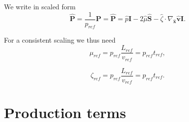 \documentclass[a4paper,11pt,english]{article}
\begin{document}
We write in scaled form
\begin{equation}
     \hat{\mathbf{P}} = \frac{1}{p_{ref}}{\mathbf{P}} = \hat{\mathbf{P}} = \hat{p} \mathbf{I} - 2\hat{\mu} \hat{\mathbf{S}} - \hat{\zeta} \cdot \nabla_{\hat{\mathbf{x}}} \hat{\mathbf{v}} \mathbf{I}.
\end{equation}

For a consistent scaling we thus need
\begin{equation}
     \mu_{ref} = p_{ref} \frac{L_{ref}}{v_{ref}} = p_{ref} t_{ref},
\end{equation}

\begin{equation}
     \zeta_{ref} = p_{ref} \frac{L_{ref}}{v_{ref}} = p_{ref} t_{ref}.
\end{equation}

\section{Production terms}
\end{document}
